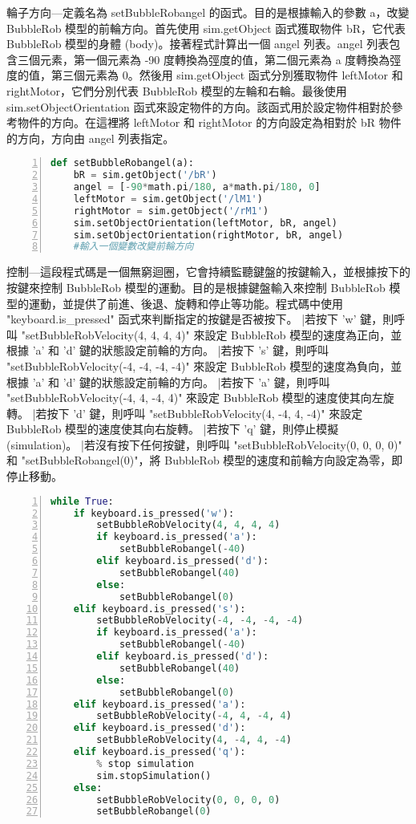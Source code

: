 輪子方向---定義名為 setBubbleRobangel 的函式。目的是根據輸入的參數 a，改變 BubbleRob 模型的前輪方向。首先使用 sim.getObject 函式獲取物件 bR，它代表 BubbleRob 模型的身體 (body)。接著程式計算出一個 angel 列表。angel 列表包含三個元素，第一個元素為 -90 度轉換為弳度的值，第二個元素為 a 度轉換為弳度的值，第三個元素為 0。然後用 sim.getObject 函式分別獲取物件 leftMotor 和 rightMotor，它們分別代表 BubbleRob 模型的左輪和右輪。最後使用 sim.setObjectOrientation 函式來設定物件的方向。該函式用於設定物件相對於參考物件的方向。在這裡將 leftMotor 和 rightMotor 的方向設定為相對於 bR 物件的方向，方向由 angel 列表指定。
\begin{lstlisting}[language=Python, frame=single, numbers=left, captionpos=b, basicstyle=\ttfamily\small,showstringspaces=false, breaklines=true, tabsize=4, xleftmargin=15pt]
def setBubbleRobangel(a):
    bR = sim.getObject('/bR')
    angel = [-90*math.pi/180, a*math.pi/180, 0]
    leftMotor = sim.getObject('/lM1')
    rightMotor = sim.getObject('/rM1')
    sim.setObjectOrientation(leftMotor, bR, angel)
    sim.setObjectOrientation(rightMotor, bR, angel)
    #輸入一個變數改變前輪方向
\end{lstlisting}

控制---這段程式碼是一個無窮迴圈，它會持續監聽鍵盤的按鍵輸入，並根據按下的按鍵來控制 BubbleRob 模型的運動。目的是根據鍵盤輸入來控制 BubbleRob 模型的運動，並提供了前進、後退、旋轉和停止等功能。程式碼中使用 "keyboard.is_pressed" 函式來判斷指定的按鍵是否被按下。 |若按下 'w' 鍵，則呼叫 "setBubbleRobVelocity(4, 4, 4, 4)" 來設定 BubbleRob 模型的速度為正向，並根據 'a' 和 'd' 鍵的狀態設定前輪的方向。 |若按下 's' 鍵，則呼叫 "setBubbleRobVelocity(-4, -4, -4, -4)" 來設定 BubbleRob 模型的速度為負向，並根據 'a' 和 'd' 鍵的狀態設定前輪的方向。 |若按下 'a' 鍵，則呼叫 "setBubbleRobVelocity(-4, 4, -4, 4)" 來設定 BubbleRob 模型的速度使其向左旋轉。 |若按下 'd' 鍵，則呼叫 "setBubbleRobVelocity(4, -4, 4, -4)" 來設定 BubbleRob 模型的速度使其向右旋轉。 |若按下 'q' 鍵，則停止模擬 (simulation)。 |若沒有按下任何按鍵，則呼叫 "setBubbleRobVelocity(0, 0, 0, 0)" 和 "setBubbleRobangel(0)"，將 BubbleRob 模型的速度和前輪方向設定為零，即停止移動。
\begin{lstlisting}[language=Python, frame=single, numbers=left, captionpos=b, basicstyle=\ttfamily\small,showstringspaces=false, breaklines=true, tabsize=4, xleftmargin=15pt]
while True:
    if keyboard.is_pressed('w'):
        setBubbleRobVelocity(4, 4, 4, 4)
        if keyboard.is_pressed('a'):
            setBubbleRobangel(-40)
        elif keyboard.is_pressed('d'):
            setBubbleRobangel(40)
        else:
            setBubbleRobangel(0)
    elif keyboard.is_pressed('s'):
        setBubbleRobVelocity(-4, -4, -4, -4)
        if keyboard.is_pressed('a'):
            setBubbleRobangel(-40)
        elif keyboard.is_pressed('d'):
            setBubbleRobangel(40)
        else:
            setBubbleRobangel(0)
    elif keyboard.is_pressed('a'):
        setBubbleRobVelocity(-4, 4, -4, 4)
    elif keyboard.is_pressed('d'):
        setBubbleRobVelocity(4, -4, 4, -4)
    elif keyboard.is_pressed('q'):
        % stop simulation
        sim.stopSimulation()
    else:
        setBubbleRobVelocity(0, 0, 0, 0)
        setBubbleRobangel(0)
\end{lstlisting}
\newpage
